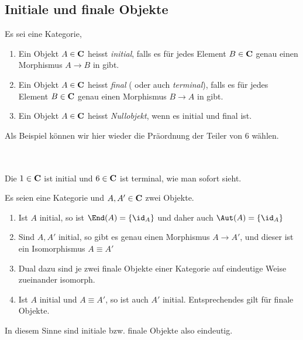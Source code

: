 \documentclass{article}
\begin{document}
\begin{bsp}[Fundamentalgruppoid]
\section{Initiale und finale Objekte}
\begin{defi}
 \cite[Definition 2.5.1]{Bra}
	Es sei \CatC eine Kategorie,
	\begin{enumerate}
		\item	 Ein Objekt \( A \in \mathbf{C} \) heisst \emph{initial}, 
		falls es f\"ur jedes Element \( B \in \mathbf{C} \) genau einen Morphismus \(A \to B \) in \CatC gibt.
		\item	 Ein Objekt \( A \in \mathbf{C} \) heisst \emph{final} ( oder auch \emph{terminal}), 
		falls es f\"ur jedes Element \( B \in \mathbf{C} \) genau einen Morphismus \(B \to A \) in \CatC gibt.
		\item	Ein Objekt \( A \in \mathbf{C} \) heisst \emph{Nullobjekt}, wenn es initial und final ist.
	\end{enumerate}
\end{defi}
	Als Beispiel k\"onnen wir hier wieder die Pr\"aordnung der Teiler von 6 w\"ahlen.
	\begin{bsp}\\
	 \\
	Die \( 1 \in \mathbf{C} \) ist initial und  \(6 \in \mathbf{C} \) ist terminal, wie man sofort sieht.
	\end{bsp}
	
\begin{lem}[Eindeutigkeit]
 \cite[Lemma 2.5.5]{Bra}
	Es seien \CatC eine Kategorie und 
	\(A , A' \in \mathbf{C} \) zwei Objekte.
	\begin{enumerate}
		\item Ist \(A \) initial, so ist \( \End(A)= \left\lbrace \id_A \right\rbrace \) und daher auch \( \Aut(A)=\left\lbrace \id_A \right\rbrace \)
		\item Sind \( A,A' \) initial, so gibt es genau einen Morphismus \( A \to A' \), und dieser ist ein Isomorphismus \( A \equiv A' \) 
		\item Dual dazu sind je zwei finale Objekte einer Kategorie auf eindeutige Weise zueinander isomorph.
		\item Ist \( A \) initial und \( A \equiv A' \), so ist auch \( A' \) initial. Entsprechendes gilt f\"ur finale Objekte.
	\end{enumerate}
	In diesem Sinne sind initiale bzw. finale Objekte also eindeutig.
\end{lem}


\end{bsp}
\end{document}
